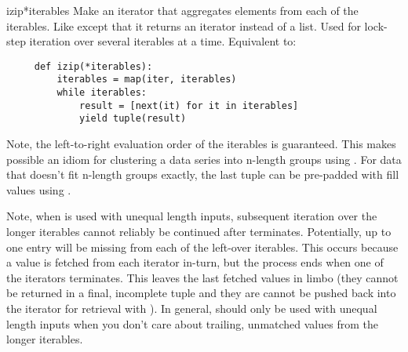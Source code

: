 \begin{funcdesc}{izip}{*iterables}
  Make an iterator that aggregates elements from each of the iterables.
  Like  except that it returns an iterator instead of
  a list.  Used for lock-step iteration over several iterables at a
  time.  Equivalent to:

  \begin{verbatim}
     def izip(*iterables):
         iterables = map(iter, iterables)
         while iterables:
             result = [next(it) for it in iterables]
             yield tuple(result)
  \end{verbatim}


  Note, the left-to-right evaluation order of the iterables is guaranteed.
  This makes possible an idiom for clustering a data series into n-length
  groups using .  For data that doesn't fit
  n-length groups exactly, the last tuple can be pre-padded with fill
  values using .
         
  Note, when  is used with unequal length inputs, subsequent
  iteration over the longer iterables cannot reliably be continued after
   terminates.  Potentially, up to one entry will be missing
  from each of the left-over iterables. This occurs because a value is fetched
  from each iterator in-turn, but the process ends when one of the iterators
  terminates.  This leaves the last fetched values in limbo (they cannot be
  returned in a final, incomplete tuple and they are cannot be pushed back
  into the iterator for retrieval with ).  In general,
   should only be used with unequal length inputs when you
  don't care about trailing, unmatched values from the longer iterables.
\end{funcdesc}

